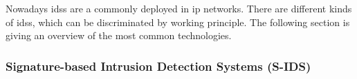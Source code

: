 Nowadays \glspl{ids} are a commonly deployed in \gls{ip} networks. There are different kinds of \glspl{ids}, which can be discriminated by working principle. The following section is giving an overview of the most common technologies. \parencite[pp.~201-202]{Northcutt2005}

\subsubsection{Signature-based Intrusion Detection Systems (S-IDS)}
\label{sec:background:network:ids:sig}

